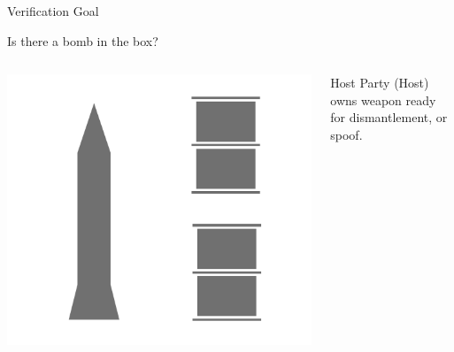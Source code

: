 \documentclass[presentation]{beamer}
\begin{document}
\begin{frame}[label=sec-2-5]{Verification Goal}
\begin{center}
Is there a bomb in the box?
\end{center}

\begin{columns}
\begin{column}{0.18\textwidth}
\includegraphics[width=\textwidth]{images/ib/box_visible}
\end{column}
\begin{column}{0.28\textwidth}
\small
Host Party (Host) owns weapon ready for dismantlement, or spoof.
\end{column}


\end{columns}
\end{frame}
\end{document}
